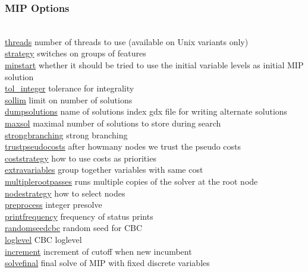 \subsubsection{MIP Options}
\begin{tabbing}
\hspace {1.3in} \= \\
\hyperlink{threads}
{threads} \> number of threads to use (available on Unix variants only) \\
\hyperlink{strategy}
{strategy} \> switches on groups of features \\
\hyperlink{mipstart}
{mipstart} \> whether it should be tried to use the initial variable levels as initial MIP solution \\
\hyperlink{tol_integer}
{tol\_integer} \> tolerance for integrality \\
\hyperlink{sollim}
{sollim} \> limit on number of solutions \\
\hyperlink{dumpsolutions}
{dumpsolutions} \> name of solutions index gdx file for writing alternate solutions \\
\hyperlink{maxsol}
{maxsol} \> maximal number of solutions to store during search \\
\hyperlink{strongbranching}
{strongbranching} \> strong branching \\
\hyperlink{trustpseudocosts}
{trustpseudocosts} \> after howmany nodes we trust the pseudo costs \\
\hyperlink{coststrategy}
{coststrategy} \> how to use costs as priorities \\
\hyperlink{extravariables}
{extravariables} \> group together variables with same cost \\
\hyperlink{multiplerootpasses}
{multiplerootpasses} \> runs multiple copies of the solver at the root node \\
\hyperlink{nodestrategy}
{nodestrategy} \> how to select nodes \\
\hyperlink{preprocess}
{preprocess} \> integer presolve \\
\hyperlink{printfrequency}
{printfrequency} \> frequency of status prints \\
\hyperlink{randomseedcbc}
{randomseedcbc} \> random seed for CBC \\
\hyperlink{loglevel}
{loglevel} \> CBC loglevel \\
\hyperlink{increment}
{increment} \> increment of cutoff when new incumbent \\
\hyperlink{solvefinal}
{solvefinal} \> final solve of MIP with fixed discrete variables \\

\end{tabbing}
